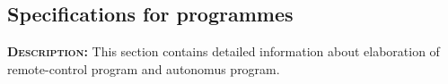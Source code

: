 \subsection{Specifications for programmes}
	\textsc{\textbf{Description:}} This section contains detailed information about elaboration of remote-control program and autonomus program.
	
	
